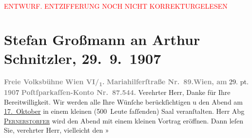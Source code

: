 
\begin{center}
            \textcolor{red}{ENTWURF. ENTZIFFERUNG NOCH NICHT KORREKTURGELESEN}
                      \end{center}
            
               \section[Stefan Großmann an Arthur Schnitzler, 29. 9. 1907]{ Stefan Großmann an Arthur Schnitzler, 29. 9. 1907}\nopagebreak{}\rehead{ }\begin{ledgroupsized}[t]{13cm}\normalsize\beginnumbering{} \toendnotes[C]{\smallbreak\pagebreak[2]} 
\toendnotes[C]{\smallbreak}\pstart
           \noindent{}{\pb}\textcolor{gray}{\textbf{Freie Volksbühne}}\pend
           \pstart
           \textcolor{gray}{\textbf{Wien VI/\textsubscript{1}.}}\pend
           \pstart
           \textcolor{gray}{\textbf{Mariahilferſtraße Nr. 89.}}\hfill \textcolor{gray}{\textbf{Wien, am}}{ }29. \damage{\textcolor{gray}{Se}}pt. \textcolor{gray}{\textbf{190}}7\pend
           \pstart
           \textcolor{gray}{\textbf{Poſtſparkaſſen-Konto Nr. 87.544.}}\pend
           \pstart\center{}Verehrter Herr,\pend\pstart
           Danke für Ihre Bereitwilligkeit.\pend
           \pstart
           Wir werden alle Ihre Wünſche berückſichtigen u den Abend am \uline{17. Oktober} in einem kleinen (500 Leute faſſenden) Saal veranſtalten. Herr Abg \uline{\textsc{Pernerstorfer}} wird den Abend mit einem kleinen Vortrag eröffnen. Dann leſen Sie, verehrter
               Herr, vielleicht den »\label{T_L01714_1v}
\end{ledgroupsized}
